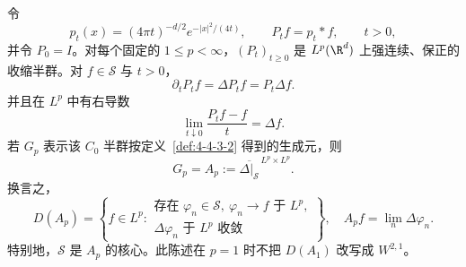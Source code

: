 \begin{proposition}[热半群]\label{proposition:7-2-3-3}
令
\[
 p_t(x)=(4\pi t)^{-d/2}e^{-|x|^2/(4t)},
 \qquad P_tf=p_t*f,\qquad t>0,
\]
并令 $P_0=I$。对每个固定的 $1\leq p<\infty$，$(P_t)_{t\geq0}$ 是
$L^p(\R^d)$ 上强连续、保正的收缩半群。对 $f\in\mathcal S$ 与 $t>0$，
\[
 \partial_tP_tf=\Delta P_tf=P_t\Delta f.
\]
并且在 $L^p$ 中有右导数
\[
 \lim_{t\downarrow0}\frac{P_tf-f}{t}=\Delta f.
\]
若 $G_p$ 表示该 $C_0$ 半群按定义~\ref{def:4-4-3-2} 得到的生成元，则
\begin{equation}\label{eq:7-2-heat-generator-closure}
 G_p=A_p:=\overline{\Delta|_{\mathcal S}}^{\,L^p\times L^p}.
\end{equation}
换言之，
\[
 D(A_p)=\left\{f\in L^p:\begin{array}{l}
   \text{存在 }\varphi_n\in\mathcal S,
   \ \varphi_n\to f\text{ 于 }L^p,\\[-2pt]
   \Delta\varphi_n\text{ 于 }L^p\text{ 收敛}
 \end{array}\right\},
 \quad A_pf=\lim_n\Delta\varphi_n.
\]
特别地，$\mathcal S$ 是 $A_p$ 的核心。此陈述在 $p=1$ 时不把 $D(A_1)$ 改写成
$W^{2,1}$。
\end{proposition}

